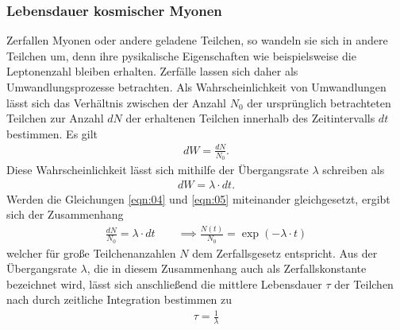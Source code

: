 \subsubsection{Lebensdauer kosmischer Myonen}
\noindent Zerfallen Myonen oder andere geladene Teilchen, so wandeln sie sich in
andere Teilchen um, denn ihre pysikalische Eigenschaften wie beispielsweise die
Leptonenzahl bleiben erhalten. Zerfälle lassen sich daher als Umwandlungsprozesse
betrachten. Als Wahrscheinlichkeit von Umwandlungen lässt sich das Verhältnis
zwischen der Anzahl $N_0$ der ursprünglich betrachteten Teilchen zur Anzahl
$dN$ der erhaltenen Teilchen innerhalb des Zeitintervalls $dt$
bestimmen. Es gilt
\begin{align}
  dW = \frac{dN}{N_0}.
  \label{eqn:04}
\end{align}
\noindent Diese Wahrscheinlichkeit lässt sich mithilfe der Übergangsrate
$\lambda$ schreiben als
\begin{align}
  dW = \lambda \cdot dt.
  \label{eqn:05}
\end{align}
\noindent Werden die Gleichungen \ref{eqn:04} und \ref{eqn:05} miteinander
gleichgesetzt, ergibt sich der Zusammenhang
\begin{align}
  \frac{dN}{N_0} = \lambda \cdot dt \qquad \implies \frac{N(t)}{N_0} = \exp{(-\lambda \cdot t)}
  \label{eqn:06}
\end{align}
\noindent welcher für große Teilchenanzahlen $N$ dem Zerfallsgesetz entspricht.
Aus der Übergangsrate $\lambda$, die in diesem Zusammenhang auch als
Zerfallskonstante bezeichnet wird, lässt sich anschließend die mittlere
Lebensdauer $\tau$ der Teilchen nach \cite{teilchen} durch zeitliche Integration
bestimmen zu
\begin{align}
  \tau = \frac{1}{\lambda}
  \label{eqn:07}
\end{align}
